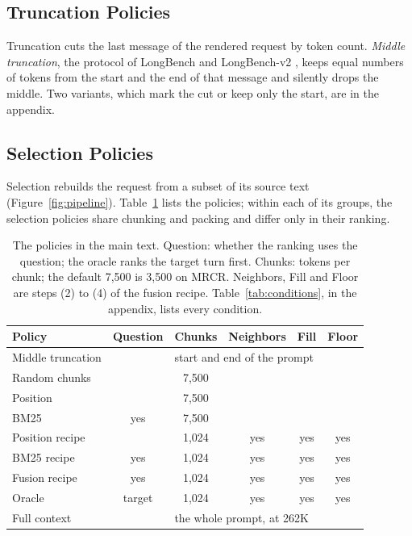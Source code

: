 \documentclass[letterpaper]{article} %
\newcommand{\recipe}{fusion recipe}
\begin{document}
\subsection{Truncation Policies}
Truncation cuts the last message of the rendered request by token count. \emph{Middle truncation}, the protocol of LongBench and LongBench-v2 \cite{bai2024longbench,bai2025longbenchv2}, keeps equal numbers of tokens from the start and the end of that message and silently drops the middle. Two variants, which mark the cut or keep only the start, are in the appendix.

\subsection{Selection Policies}
Selection rebuilds the request from a subset of its source text (Figure~\ref{fig:pipeline}). Table~\ref{tab:policies} lists the policies; within each of its groups, the selection policies share chunking and packing and differ only in their ranking.

\begin{table}[t]
\centering
\small
\setlength{\tabcolsep}{3pt}
\begin{tabular}{lccccc}
\toprule
Policy & Question & Chunks & Neighbors & Fill & Floor \\
\midrule
Middle truncation & & \multicolumn{4}{l}{start and end of the prompt} \\
\addlinespace
Random chunks & & 7,500 & & & \\
Position & & 7,500 & & & \\
BM25 & yes & 7,500 & & & \\
\addlinespace
Position recipe & & 1,024 & yes & yes & yes \\
BM25 recipe & yes & 1,024 & yes & yes & yes \\
Fusion recipe & yes & 1,024 & yes & yes & yes \\
Oracle & target & 1,024 & yes & yes & yes \\
\addlinespace
Full context & & \multicolumn{4}{l}{the whole prompt, at 262K} \\
\bottomrule
\end{tabular}
\caption{The policies in the main text. Question: whether the ranking uses the question; the oracle ranks the target turn first. Chunks: tokens per chunk; the default 7,500 is 3,500 on MRCR. Neighbors, Fill and Floor are steps (2) to (4) of the \recipe. Table~\ref{tab:conditions}, in the appendix, lists every condition.}
\label{tab:policies}
\end{table}
\end{document}
